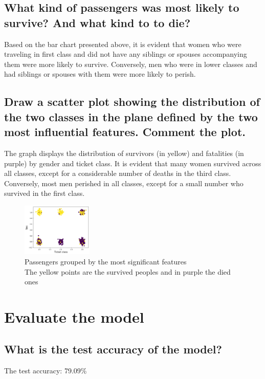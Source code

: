 \documentclass{article}
\begin{document}
\subsection{What kind of passengers was most likely to survive? And what kind to to die?}
Based on the bar chart presented above, it is evident that women who were traveling in first class
and did not have any siblings or spouses accompanying them were more likely to survive.
Conversely, men who were in lower classes and had siblings or spouses with them were more likely to perish.

\clearpage

\subsection{Draw a scatter plot showing the distribution of the two classes in the plane defined by the two most influential features. Comment the plot.}
The graph displays the distribution of survivors (in yellow) and fatalities (in purple) by gender and ticket class.
It is evident that many women survived across all classes,
except for a considerable number of deaths in the third class.
Conversely, most men perished in all classes, except for a small number who survived in the first class.

\begin{figure}[h]
  \centering
  \includegraphics[width=0.3\textwidth]{images/Scatter_Sex_Class.png}
  \caption[Passengers grouped by the most significant features; The yellow points are the survived peoples and in purple the died ones]
  {Passengers grouped by the most significant features\\ The yellow points are the survived peoples and in purple the died ones\endtabular}
  \label{fig:scatter}

\end{figure}
\clearpage

\section{Evaluate the model}
\subsection{What is the test accuracy of the model?}
The test accuracy: 79.09\%
\end{document}
